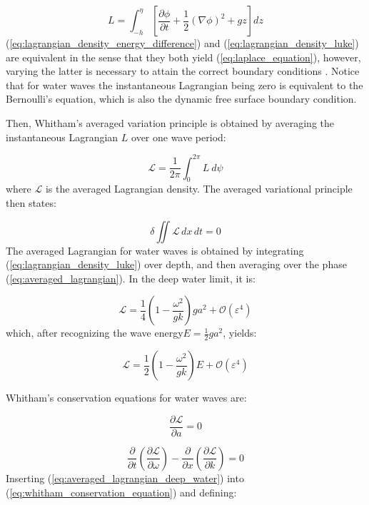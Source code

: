 \documentclass[lineno]{jfm}
\begin{document}
\begin{equation}
  L = \int_{-h}^{\eta} \left[ \frac{\partial \phi}{\partial t} + \frac{1}{2} (\nabla{\phi})^2 + gz \right] dz
  \label{eq:lagrangian_density_luke}
\end{equation}
(\ref{eq:lagrangian_density_energy_difference}) and (\ref{eq:lagrangian_density_luke})
are equivalent in the sense that they both yield (\ref{eq:laplace_equation}),
however, varying the latter is necessary to attain the correct boundary conditions
\citep{whitham1967non}.
Notice that for water waves the instantaneous Lagrangian being zero is
equivalent to the Bernoulli's equation, which is also the dynamic free surface
boundary condition.

Then, Whitham's averaged variation principle is obtained by averaging the
instantaneous Lagrangian $L$ over one wave period:

\begin{equation}
  \mathcal{L} = \frac{1}{2\pi} \int_0^{2\pi} L\ d\psi
  \label{eq:averaged_lagrangian}
\end{equation}
where $\mathcal{L}$ is the averaged Lagrangian density.
The averaged variational principle then states:

\begin{equation}
  \delta \iint \mathcal{L}\, dx\,dt = 0
\end{equation}
The averaged Lagrangian for water waves is obtained by integrating
(\ref{eq:lagrangian_density_luke}) over depth, and then averaging over the phase
(\ref{eq:averaged_lagrangian}).
In the deep water limit, it is:

\begin{equation}
  \mathcal{L} = \frac{1}{4} \left( 1 - \frac{\omega^2}{gk} \right) g a^2 + \mathcal{O}(\varepsilon^4)
\end{equation}
which, after recognizing the wave energy$E = \frac{1}{2} g a^2$, yields:

\begin{equation}
  \mathcal{L} = \frac{1}{2} \left( 1 - \frac{\omega^2}{gk} \right) E + \mathcal{O}(\varepsilon^4)
  \label{eq:averaged_lagrangian_deep_water}
\end{equation}

Whitham's conservation equations for water waves are:

\begin{equation}
  \frac{\partial \mathcal{L}}{\partial a} = 0
\end{equation}

\begin{equation}
  \frac{\partial}{\partial t} \left(\frac{\partial \mathcal{L}}{\partial \omega}\right) - \frac{\partial}{\partial x} \left(\frac{\partial \mathcal{L}}{\partial k}\right) = 0
  \label{eq:whitham_conservation_equation}
\end{equation}
Inserting (\ref{eq:averaged_lagrangian_deep_water}) into (\ref{eq:whitham_conservation_equation})
and defining:
\end{document}
